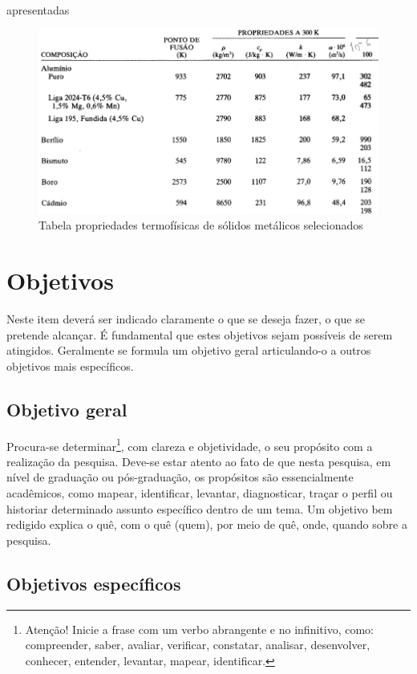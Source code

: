 apresentadas
 
\begin{figure}[ht]
	\centering
	\caption{Tabela propriedades termofísicas de sólidos metálicos selecionados}\label{fig:metalProps}
	\includegraphics[width=15cm]{figuras/metalProps.jpg}
\end{figure}


\section{Objetivos}

Neste item deverá ser indicado claramente o que se deseja fazer, o que se pretende alcançar. É fundamental que estes objetivos sejam possíveis de serem atingidos. Geralmente se formula um objetivo geral articulando-o a outros objetivos mais específicos.

\subsection{Objetivo geral}

Procura-se determinar\footnote{Atenção! Inicie a frase com um verbo abrangente e no infinitivo, como: compreender, saber, avaliar, verificar, constatar, analisar, desenvolver, conhecer, entender, levantar, mapear, identificar.}, com clareza e objetividade, o seu propósito com a realização da pesquisa. Deve-se estar atento ao fato de que nesta pesquisa, em nível de graduação ou pós-graduação, os propósitos são essencialmente acadêmicos, como mapear, identificar, levantar, diagnosticar, traçar o perfil ou historiar determinado assunto específico dentro de um tema. Um objetivo bem redigido explica o quê, com o quê (quem), por meio de quê, onde, quando sobre a pesquisa.

\subsection{Objetivos específicos}

